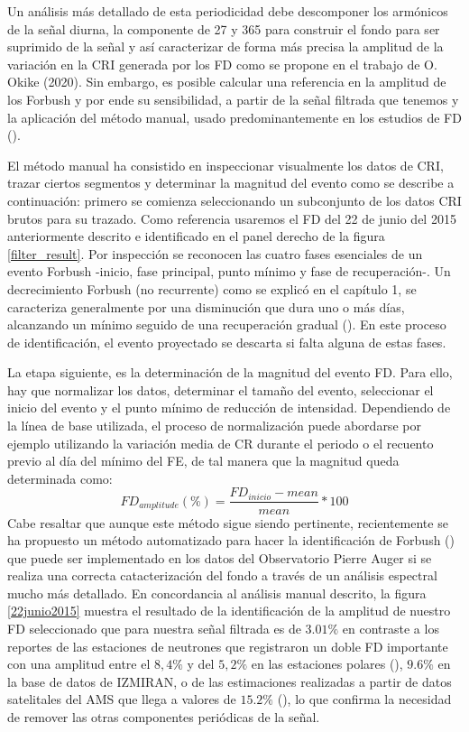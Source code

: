 Un análisis más detallado de esta periodicidad debe descomponer los armónicos de la señal diurna, la componente de 27 y 365 para construir el fondo para ser suprimido de la señal y así caracterizar de forma más precisa la amplitud de la variación en la CRI generada por los FD como se propone en el trabajo de O. Okike (2020). Sin embargo, es posible calcular una referencia en la amplitud de los Forbush y por ende su sensibilidad, a partir de la señal filtrada que tenemos y la aplicación del método manual, usado predominantemente en los estudios de FD (\cite{okike_2020}). 

El método manual ha consistido en inspeccionar visualmente los datos de CRI, trazar ciertos segmentos y determinar la magnitud del evento como se describe a continuación: primero se comienza seleccionando un subconjunto de los datos CRI brutos para su trazado. Como referencia usaremos el FD del 22 de junio del 2015 anteriormente descrito e identificado en el panel derecho de la figura \ref{filter_result}. Por inspección se reconocen las cuatro fases esenciales de un evento Forbush  -inicio, fase principal, punto mínimo y fase de recuperación-. Un decrecimiento Forbush (no recurrente) como se explicó en el capítulo 1, se caracteriza generalmente por una disminución que dura uno o más días, alcanzando un mínimo seguido de una recuperación gradual (\cite{lingri_2016}). En este proceso de identificación, el evento proyectado se descarta si falta alguna de estas fases. 

La etapa siguiente, es la determinación de la magnitud del evento FD. Para ello, hay que normalizar los datos, determinar el tamaño del evento, seleccionar el inicio del evento y el punto mínimo de reducción de intensidad. Dependiendo de la línea de base utilizada, el proceso de normalización puede abordarse por ejemplo utilizando la variación media de CR durante el periodo o el recuento previo al día del mínimo del FE, de tal manera que la magnitud queda determinada como:
\begin{equation}
    FD_{amplitude}(\%)=\frac{FD_{inicio}-mean}{mean} *100
    \label{amplitud_fd}
\end{equation}
Cabe resaltar que aunque este método sigue siendo pertinente, recientemente se ha propuesto un método automatizado para hacer la identificación de Forbush (\cite{okike_2020}) que puede ser implementado en los datos del Observatorio Pierre Auger si se realiza una correcta catacterización del fondo a través de un análisis espectral mucho más detallado. En concordancia al análisis manual descrito, la figura \ref{22junio2015} muestra el resultado de la identificación de la amplitud de nuestro FD seleccionado que para nuestra señal filtrada es de $3.01\%$ en contraste a los reportes de las estaciones de neutrones que registraron un doble FD importante con una amplitud entre el $8,4\%$ y del $ 5,2\%$ en las estaciones polares (\cite{samara_2018}), $9.6\%$ en la base de datos de IZMIRAN, o de las estimaciones realizadas a partir de datos satelitales del AMS que llega a valores de $15.2\%$ (\cite{wang_2023}), lo que confirma la necesidad de remover las otras componentes periódicas de la señal. 

